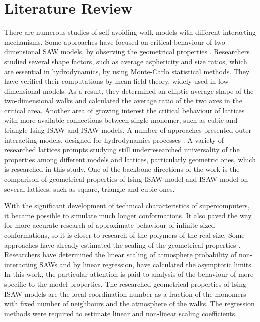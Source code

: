 
\section{Literature Review}

There are numerous studies of self-avoiding walk models with different interacting mechanisms. 
Some approaches have focused on critical behaviour of two-dimensional SAW models, by observing the geometrical properties \cite{Caracciolo2011, owczarek2000first, arkin2013gyration}. 
Researchers studied several shape factors, such as average asphericity and size ratios, which are essential in hydrodynamics, by using Monte-Carlo statistical methods. 
They have verified their computations by mean-field theory, widely used in low-dimensional models. 
As a result, they determined an elliptic average shape of the two-dimensional walks and calculated the average ratio of the two axes in the critical area.
Another area of growing interest the critical behaviour of lattices with more available connections between single monomer, such as cubic and triangle Ising-ISAW \cite{Foster2021} and ISAW \cite{Tesi1996, Privman1986} models. 
A number of approaches presented outer-interacting models, designed for hydrodynamics processes \cite{LivneSAW1988, madras1988pivot}. 
A variety of researched lattices prompts studying still underresearched universality of the properties among different models and lattices, particularly geometric ones, which is researched in this study. 
One of the backbone directions of the work is the comparison of geometrical properties of Ising-ISAW model and ISAW model on several lattices, such as square, triangle and cubic ones.

With the significant development of technical characteristics of supercomputers, it became possible to simulate much longer conformations. 
It also paved the way for more accurate research of approximate behaviour of infinite-sized conformations, so it is closer to research of the polymers of the real size. 
Some approaches have already estimated the scaling of the geometrical properties \cite{owczarek2008scaling}. 
Researchers have determined the linear scaling of atmosphere probability of non-interacting SAWs and by linear regression, have calculated the asymptotic limits. 
In this work, the particular attention is paid to analysis of the behaviour of more specific to the model properties. 
The researched geometrical properties of Ising-ISAW models are the local coordination number as a fraction of the monomers with fixed number of neighbours and the atmosphere of the walks. 
The regression methods were required to estimate linear and non-linear scaling coefficients.
